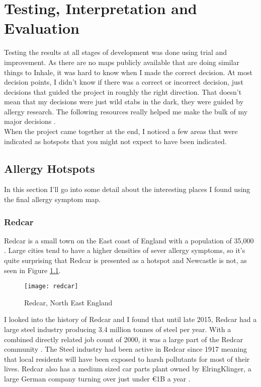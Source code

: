 \chapter{Testing, Interpretation and Evaluation}
\label{cha:tande}
 
Testing the results at all stages of development was done using trial and improvement. As there are no maps publicly available that are doing similar things to Inhale, it was hard to know when I made the correct decision. At most decision points, I didn't know if there was a correct or incorrect decision, just decisions that guided the project in roughly the right direction. That doesn't mean that my decisions were just wild stabs in the dark, they were guided by allergy research. The following resources really helped me make the bulk of my major decisions \cite{childhood, rhinitis, co2pollen, waldo}.\\
 
When the project came together at the end, I noticed a few areas that were indicated as hotspots that you might not expect to have been indicated.

\section{Allergy Hotspots}

In this section I'll go into some detail about the interesting places I found using the final allergy symptom map.

\subsection{Redcar}

Redcar is a small town on the East coast of England with a population of 35,000 \cite{redcarpop}. Large cities tend to have a higher densities of sever allergy symptoms, so it's quite surprising that Redcar is presented as a hotspot and Newcastle is not, as seen in Figure \ref{fig:redcar}.\\

\begin{figure}[H]
\begin{center}
\texttt{[image: redcar]}
\caption{Redcar, North East England}
\label{fig:redcar}
\end{center}
\end{figure}

I looked into the history of Redcar and I found that until late 2015, Redcar had a large steel industry producing 3.4 million tonnes of steel per year. With a combined directly related job count of 2000, it was a large part of the Redcar community \cite{bbcredcar}. The Steel industry had been active in Redcar since 1917 meaning that local residents will have been exposed to harsh pollutants for most of their lives. Redcar also has a medium sized car parts plant owned by ElringKlinger, a large German company turning over just under \euro1B a year \cite{guardez}.\\

